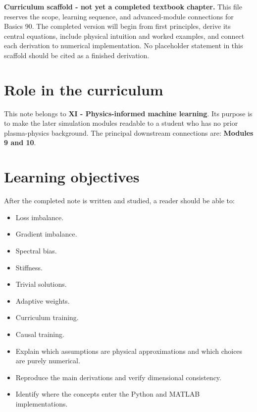 \documentclass[11pt]{article}
\begin{document}

\begin{overviewbox}
\textbf{Curriculum scaffold - not yet a completed textbook chapter.} This file reserves the scope, learning sequence, and advanced-module connections for Basics 90. The completed version will begin from first principles, derive its central equations, include physical intuition and worked examples, and connect each derivation to numerical implementation. No placeholder statement in this scaffold should be cited as a finished derivation.
\end{overviewbox}

\ProjectTOC

\section{Role in the curriculum}
This note belongs to \textbf{XI - Physics-informed machine learning}. Its purpose is to make the later simulation modules readable to a student who has no prior plasma-physics background. The principal downstream connections are: \textbf{Modules 9 and 10}.

\section{Learning objectives}
After the completed note is written and studied, a reader should be able to:
\begin{itemize}[leftmargin=1.6em]
\item Loss imbalance.
\item Gradient imbalance.
\item Spectral bias.
\item Stiffness.
\item Trivial solutions.
\item Adaptive weights.
\item Curriculum training.
\item Causal training.
\item Explain which assumptions are physical approximations and which choices are purely numerical.
\item Reproduce the main derivations and verify dimensional consistency.
\item Identify where the concepts enter the Python and MATLAB implementations.
\end{itemize}
\end{document}
